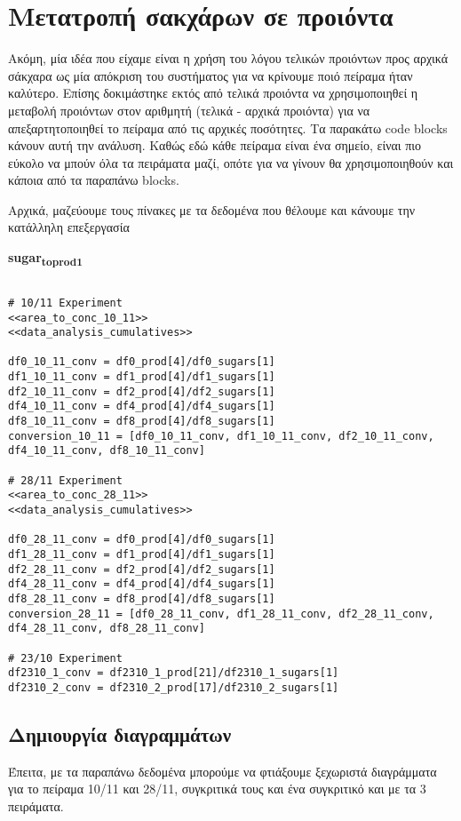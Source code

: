 \documentclass[11pt]{article}
\begin{document}
\section{Μετατροπή σακχάρων σε προιόντα}
\label{sec:org3e4e804}
Ακόμη, μία ιδέα που είχαμε είναι η χρήση του λόγου τελικών προιόντων προς αρχικά σάκχαρα ως μία απόκριση του συστήματος για να κρίνουμε ποιό πείραμα ήταν καλύτερο. Επίσης δοκιμάστηκε εκτός από τελικά προιόντα να χρησιμοποιηθεί η μεταβολή προιόντων στον αριθμητή (τελικά - αρχικά προιόντα) για να απεξαρτητοποιηθεί το πείραμα από τις αρχικές ποσότητες. Τα παρακάτω code blocks κάνουν αυτή την ανάλυση. Καθώς εδώ κάθε πείραμα είναι ένα σημείο, είναι πιο εύκολο να μπούν όλα τα πειράματα μαζί, οπότε για να γίνουν θα χρησιμοποιηθούν και κάποια από τα παραπάνω blocks.

Αρχικά, μαζεύουμε τους πίνακες με τα δεδομένα που θέλουμε και κάνουμε την κατάλληλη επεξεργασία

\textbf{sugar\textsubscript{to}\textsubscript{prod}\textsubscript{1}}
\begin{verbatim}

# 10/11 Experiment
<<area_to_conc_10_11>>
<<data_analysis_cumulatives>>

df0_10_11_conv = df0_prod[4]/df0_sugars[1]
df1_10_11_conv = df1_prod[4]/df1_sugars[1]
df2_10_11_conv = df2_prod[4]/df2_sugars[1]
df4_10_11_conv = df4_prod[4]/df4_sugars[1]
df8_10_11_conv = df8_prod[4]/df8_sugars[1]
conversion_10_11 = [df0_10_11_conv, df1_10_11_conv, df2_10_11_conv, df4_10_11_conv, df8_10_11_conv]

# 28/11 Experiment
<<area_to_conc_28_11>>
<<data_analysis_cumulatives>>

df0_28_11_conv = df0_prod[4]/df0_sugars[1]
df1_28_11_conv = df1_prod[4]/df1_sugars[1]
df2_28_11_conv = df2_prod[4]/df2_sugars[1]
df4_28_11_conv = df4_prod[4]/df4_sugars[1]
df8_28_11_conv = df8_prod[4]/df8_sugars[1]
conversion_28_11 = [df0_28_11_conv, df1_28_11_conv, df2_28_11_conv, df4_28_11_conv, df8_28_11_conv]

# 23/10 Experiment
df2310_1_conv = df2310_1_prod[21]/df2310_1_sugars[1]
df2310_2_conv = df2310_2_prod[17]/df2310_2_sugars[1]
\end{verbatim}

\subsection{Δημιουργία διαγραμμάτων}
\label{sec:org096a541}
Έπειτα, με τα παραπάνω δεδομένα μπορούμε να φτιάξουμε ξεχωριστά διαγράμματα για το πείραμα 10/11 και 28/11, συγκριτικά τους και ένα συγκριτικό και με τα 3 πειράματα.
\end{document}
